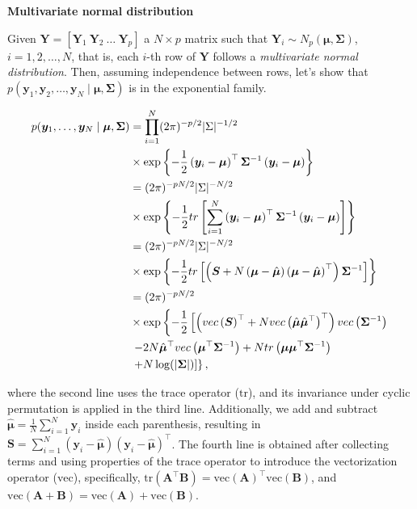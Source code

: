 \begin{enumerate}
\textbf{Multivariate normal distribution}

Given $\bm{Y}=[\bm{Y}_1 \ \bm{Y}_2 \ \dots \ \bm{Y}_p]$ a $N\times p$ matrix such that $\bm{Y}_i\sim N_p(\bm{\mu},\bm{\Sigma})$, $i=1,2,\dots,N$, that is, each $i$-th row of $\bm{Y}$ follows a \textit{multivariate normal distribution}. Then, assuming independence between rows, let's show that $p(\bm{y}_1,\bm{y}_2,\dots,\bm{y}_N\mid \bm{\mu},\bm{\Sigma})$ is in the exponential family.

\begin{align*}
	\allowdisplaybreaks
	p(\bm{y}_1,\dots,\bm{y}_N\mid \bm{\mu},\bm{\Sigma})&=\prod_{i=1}^N (2\pi)^{-p/2}| \Sigma|^{-1/2}\\
	&\times\exp\left\{-\frac{1}{2}\left(\bm{y}_i-\bm{\mu}\right)^{\top}\bm{\Sigma}^{-1}\left(\bm{y}_i-\bm{\mu}\right)\right\}\\
	&= (2\pi)^{-pN/2}|\Sigma|^{-N/2}\\
	&\times\exp\left\{-\frac{1}{2}tr\left[\sum_{i=1}^N\left(\bm{y}_i-\bm{\mu}\right)^{\top}\bm{\Sigma}^{-1}\left(\bm{y}_i-\bm{\mu}\right)\right]\right\}\\
	&= (2\pi)^{-p N/2}|\Sigma|^{-N/2}\\
	&\times\exp\left\{-\frac{1}{2}tr\left[\left(\bm{S}+N\left(\bm{\mu}-\hat{\bm{\mu}}\right)\left(\bm{\mu}-\hat{\bm{\mu}}\right)^{\top}\right)\bm{\Sigma}^{-1}\right]\right\}\\
	&= (2\pi)^{-p N/2}\\
	&\times\exp\left\{-\frac{1}{2}\left[\left(vec\left(\bm{S}\right)^{\top}+N vec\left(\hat{\bm{\mu}}\hat{\bm{\mu}}^{\top}\right)^{\top}\right)vec \left(\bm{\Sigma}^{-1}\right)\right.\right.\\
	&\left.\left.-2N\hat{\bm{\mu}}^{\top}vec\left(\bm{\mu}^{\top}\bm{\Sigma}^{-1}\right)+N tr\left(\bm{\mu}\bm{\mu}^{\top}\bm{\Sigma}^{-1}\right)\right.\right.\\
	&\left.\left.+N\log (|\bm{\Sigma}|)\right]\right\},
\end{align*}


where the second line uses the trace operator ($\text{tr}$), and its invariance under cyclic permutation is applied in the third line. Additionally, we add and subtract $\hat{\bm{\mu}} = \frac{1}{N}\sum_{i=1}^N \bm{y}_i$ inside each parenthesis, resulting in $\bm{S} = \sum_{i=1}^N \left(\bm{y}_i - \hat{\bm{\mu}}\right) \left(\bm{y}_i - \hat{\bm{\mu}}\right)^{\top}$. The fourth line is obtained after collecting terms and using properties of the trace operator to introduce the vectorization operator ($\text{vec}$), specifically, $ \text{tr}(\bm{A}^{\top}\bm{B}) = \text{vec}(\bm{A})^{\top} \text{vec}(\bm{B})$, and $ \text{vec}(\bm{A} + \bm{B}) = \text{vec}(\bm{A}) + \text{vec}(\bm{B})$.


\end{enumerate}

